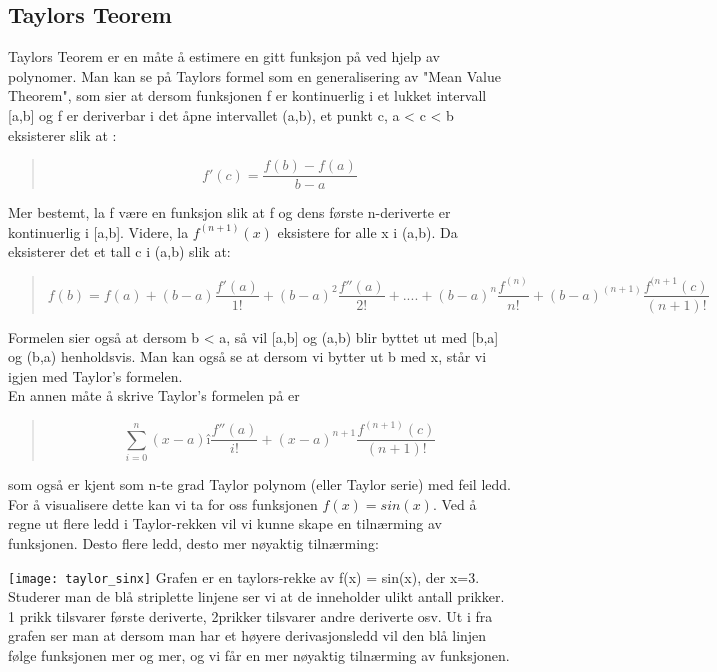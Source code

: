 \subsection{Taylors Teorem}
Taylors Teorem er en måte å estimere en gitt funksjon på ved hjelp av polynomer. Man kan se på Taylors formel som en generalisering av "Mean Value Theorem", som sier at dersom funksjonen f er kontinuerlig i et lukket intervall [a,b] og f er deriverbar i det åpne intervallet (a,b), et punkt c, a < c < b eksisterer slik at :
\begin{quote}
\begin{equation}
f'(c) = \frac{f(b) - f(a)}{b-a}
\end{equation}
\end{quote}
Mer bestemt, la f være en funksjon slik at f og dens første n-deriverte er kontinuerlig i [a,b]. Videre, la $f^{(n+1)}(x)$ eksistere for alle x i (a,b). Da eksisterer det et tall c i (a,b) slik at:
\begin{quote}
\begin{equation}
f(b) = f(a) + (b-a) \frac{f'(a)}{1!} + (b-a)^2 \frac{f''(a)}{2!} + .... + (b-a)^n \frac{f^{(n)}}{n!} + (b-a)^{(n+1)} \frac{f^{(n+1} (c)}{(n+1)!}
\end{equation}
\end{quote}
Formelen sier også at dersom b < a, så vil [a,b] og (a,b) blir byttet ut med [b,a] og (b,a) henholdsvis. Man kan også se at dersom vi bytter ut b med x, står vi igjen med Taylor's formelen. \\
En annen måte å skrive Taylor's formelen på er
\begin{quote}
\begin{equation}
\sum_{i=0}^n (x-a)î \frac{f''(a)}{i!} + (x-a)^{n+1} \frac{f^{(n+1)} (c) }{(n+1)!}
\end{equation}
\end{quote}
som også er kjent som n-te grad Taylor polynom (eller Taylor serie) med feil ledd.\\
For å visualisere dette kan vi ta for oss funksjonen $f(x) = sin(x)$. Ved å regne ut flere ledd i Taylor-rekken vil vi kunne skape en tilnærming av funksjonen. Desto flere ledd, desto mer nøyaktig tilnærming:

\texttt{[image: taylor\_sinx]}
Grafen er en taylors-rekke av f(x) = sin(x), der x=3. Studerer man de blå striplette linjene ser vi at de inneholder ulikt antall prikker. 1 prikk tilsvarer første deriverte, 2prikker tilsvarer andre deriverte osv. Ut i fra grafen ser man at dersom man har et høyere derivasjonsledd vil den blå linjen følge funksjonen mer og mer, og vi får en mer nøyaktig tilnærming av funksjonen. 
 
